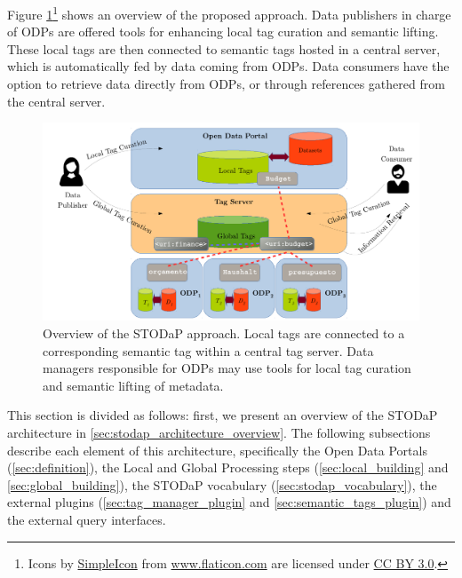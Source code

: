 Figure \ref{fig:overview}\footnote{Icons by \href{http://www.flaticon.com/authors/simpleicon}{SimpleIcon} from \href{http://www.flaticon.com}{www.flaticon.com} are licensed under \href{http://creativecommons.org/licenses/by/3.0/}{CC BY 3.0}.} shows an overview of the proposed approach.
Data publishers in charge of ODPs are offered tools for enhancing local tag curation and semantic lifting.
These local tags are then connected to semantic tags hosted in a central server, which is automatically fed by data coming from ODPs.
Data consumers have the option to retrieve data directly from ODPs, or through references gathered from the central server.

\begin{figure}[t]
\begin{center}
\includegraphics[width=\columnwidth]{images/overview.pdf}
\caption[Overview of the STODaP approach.]{Overview of the STODaP approach. Local tags are connected to a corresponding semantic tag within a central tag server. 
Data managers responsible for ODPs may use tools for local tag curation and semantic lifting of metadata.}
\label{fig:overview}
\end{center}
\end{figure}

This section is divided as follows: first, we present an overview of the STODaP architecture in \autoref{sec:stodap_architecture_overview}.
The following subsections describe each element of this architecture, specifically the Open Data Portals (\autoref{sec:definition}), the Local and Global Processing steps (\autoref{sec:local_building} and \ref{sec:global_building}), the STODaP vocabulary (\autoref{sec:stodap_vocabulary}), the external plugins (\autoref{sec:tag_manager_plugin} and \autoref{sec:semantic_tags_plugin}) and the external query interfaces.


